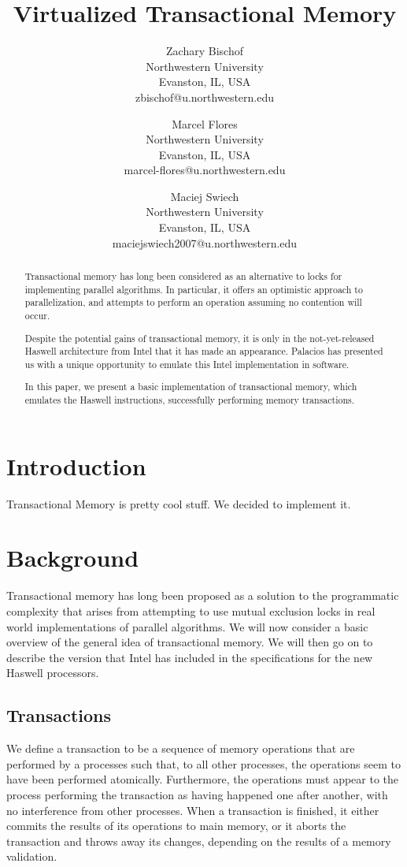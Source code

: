 \documentclass{acm_proc_article-sp}
\title{Virtualized Transactional Memory}
\author{Zachary Bischof \\
	Northwestern University\\
	Evanston, IL, USA\\
	zbischof@u.northwestern.edu
	\and 
	Marcel Flores \\
	Northwestern University\\
	Evanston, IL, USA\\
	marcel-flores@u.northwestern.edu
	\and
	Maciej Swiech \\
	Northwestern University\\
	Evanston, IL, USA\\
	maciejswiech2007@u.northwestern.edu
	}
\begin{document}
\maketitle

\begin{abstract}
Transactional memory has long been considered as an alternative to locks for
implementing parallel algorithms. In particular, it offers an optimistic
approach to parallelization, and attempts to perform an operation assuming no
contention will occur.

Despite the potential gains of transactional memory, it is only in the 
not-yet-released Haswell architecture from Intel that it has made an appearance.
Palacios has presented us with a unique opportunity to emulate this Intel
implementation in software.

In this paper, we present a basic implementation of transactional memory, which
emulates the Haswell instructions, successfully performing memory transactions.
\end{abstract}

\section{Introduction}
Transactional Memory is pretty cool stuff. We decided to implement it.

\section{Background}
Transactional memory has long been proposed as a solution to the programmatic 
complexity that arises from attempting to use mutual exclusion locks in real world 
implementations of parallel algorithms. We will now consider a basic overview 
of the general idea of transactional memory. We will then go on to describe the
 version that Intel has included in the specifications for the new Haswell 
processors.

\subsection{Transactions}
We define a transaction to be a sequence of memory operations that are 
performed by a processes such that, to all other processes, the operations 
seem to have been performed atomically. Furthermore, the operations must 
appear to the process performing the transaction as having happened one after 
another, with no interference from other processes. When a transaction is finished,
 it either commits the results of its operations to main memory, or it aborts 
the transaction and throws away its changes, depending on the results of a
memory validation.
\end{document}
